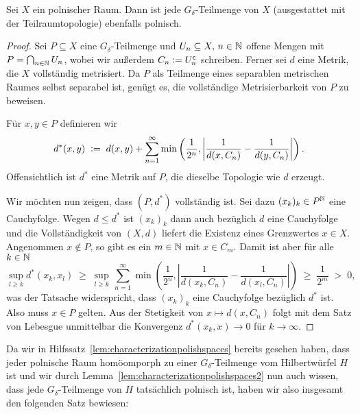 \documentclass[../main/main.tex]{subfiles}
\begin{document}
	\begin{Hilfssatz}
		\label{lem:characterizationpolishspaces2}
		Sei $X$ ein polnischer Raum. Dann ist jede $G_\delta$-Teilmenge 
		von $X$ (ausgestattet mit der Teilraumtopologie) ebenfalls polnisch.
	\end{Hilfssatz}
	
	\begin{proof}
		Sei $P \subseteq X$ eine $G_\delta$-Teilmenge und 
		$U_n \subseteq X, \, n \in \mathbb{N}$ offene Mengen mit 
		$P = \bigcap_{n \in \mathbb{N}} U_n$, wobei wir außerdem 
		$C_n \vcentcolon = U_n^{\mathsf{c}}$ schreiben. Ferner sei 
		$d$ eine Metrik, die $X$ vollständig metrisiert. 
		Da $P$ als Teilmenge eines separablen metrischen Raumes 
		selbst separabel ist, genügt es, die vollständige Metrisierbarkeit 
		von $P$ zu beweisen.
		
		Für $x, y \in P$ definieren wir
		\[d^\ast(x, y) \; \vcentcolon = \; d(x, y) + \sum_{n=1}^{\infty} \min \left(
		\frac{1}{2^n}, \left| \frac{1}{d(x, C_n)} - \frac{1}{d(y, C_n)} \right|
		\right) \text{.}\]
		Offensichtlich ist $d^\ast$ eine Metrik auf $P$, 
		die dieselbe Topologie wie $d$ erzeugt. 
		
		Wir möchten nun zeigen, dass $(P, d^\ast)$ vollständig ist. 
		Sei dazu $(x_k)_k \in P^{\mathbb{N}}$ eine Cauchyfolge. Wegen $d \leq d^\ast$ 
		ist $(x_k)_k$ dann auch bezüglich $d$ eine Cauchyfolge und die 
		Vollständigkeit von $(X, d)$ liefert die Existenz eines Grenzwertes 
		$x \in X$. Angenommen $x \notin P$, so gibt es ein $m \in \mathbb{N}$ mit 
		$x \in C_m$. Damit ist aber für alle $k \in \mathbb{N}$
		$$\sup_{l \geq k} d^\ast(x_k, x_l) \; \geq \; \sup_{l \geq k} 
		\, \sum_{n=1}^{\infty} \min \left(
		\frac{1}{2^n}, \left| \frac{1}{d(x_k, C_n)} -
		\frac{1}{d(x_l, C_n)} \right|
		\right) \; \geq \; \frac{1}{2^m} \; > \; 0 \text{,}$$
		was der Tatsache widerspricht, dass $(x_k)_k$ eine Cauchyfolge 
		bezüglich $d^\ast$ ist. Also muss $x \in P$ gelten. 
		Aus der Stetigkeit von $x \mapsto d(x, C_n)$ folgt mit dem 
		Satz von Lebesgue unmittelbar die Konvergenz 
		$d^\ast(x_k, x) \to 0$ für $k \to \infty$.
	\end{proof}
	
	Da wir in Hilfssatz~\ref{lem:characterizationpolishspaces} bereits 
	gesehen haben, dass jeder polnische Raum homöomporph zu einer 
	$G_\delta$-Teilmenge vom Hilbertwürfel $H$ ist und wir durch 
	Lemma~\ref{lem:characterizationpolishspaces2} nun auch wissen, 
	dass jede $G_\delta$-Teilmenge von $H$ tatsächlich polnisch ist, 
	haben wir also insgesamt den folgenden Satz bewiesen:
	
\end{document}
